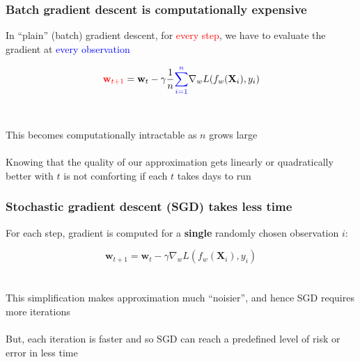 \documentclass{beamer}
\begin{document}
\begin{frame}
	\frametitle{Batch gradient descent is computationally expensive}
	In ``plain'' (batch) gradient descent, for \textcolor{red}{every step}, 
	we have to evaluate the gradient at \textcolor{blue} {every observation}

	$$
	\textcolor{red}{\mathbf{w}_{t+1}} = \mathbf{w}_t - \gamma \frac{1}{n}
	\textcolor{blue}{\sum_{i=1}^n}
	\nabla_w L(f_w(\mathbf{X}_i), y_i)
	$$\\~\\

	This becomes computationally intractable as $n$ grows large \\~\\

	Knowing that the quality of our approximation gets linearly or
	quadratically better with $t$ is not comforting if each $t$ takes days to run
\end{frame}

\begin{frame}
	\frametitle{Stochastic gradient descent (SGD) takes less time}

	For each step, gradient is computed for a \textbf{single} randomly
	chosen observation $i$:

	$$
	{\mathbf{w}_{t+1}} = \mathbf{w}_t - \gamma \nabla_w L(f_w(\mathbf{X}_i), y_i)
	$$ \\~\\

	This simplification makes approximation much ``noisier'', and hence SGD
	requires more iterations \\~\\

	But, each iteration is faster and so SGD can reach a predefined
	level of risk or error in less time
\end{frame}
\end{document}
